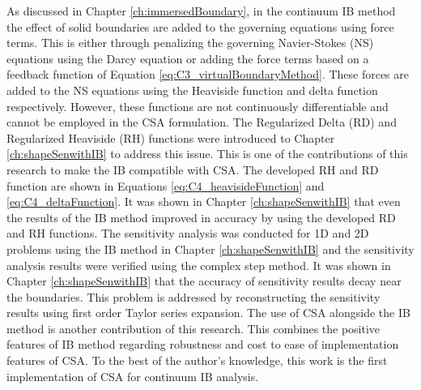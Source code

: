 As discussed in Chapter \ref{ch:immersedBoundary}, in the continuum IB method the effect of solid boundaries are added to the governing equations using force terms. This is either through penalizing the governing Navier-Stokes (NS) equations using the Darcy equation or adding the force terms based on a feedback function of Equation \eqref{eq:C3_virtualBoundaryMethod}. These forces are added to the NS equations using the Heaviside function and delta function respectively. However, these functions are not continuously differentiable and cannot be employed in the CSA formulation. The Regularized Delta (RD) and Regularized Heaviside (RH) functions were introduced to Chapter \ref{ch:shapeSenwithIB} to address this issue. This is one of the contributions of this research to make the IB compatible with CSA. The developed RH and RD function are shown in Equations \eqref{eq:C4_heavisideFunction} and \eqref{eq:C4_deltaFunction}. It was shown in Chapter \ref{ch:shapeSenwithIB} that even the results of the IB method improved in accuracy by using the developed RD and RH functions. The sensitivity analysis was conducted for 1D and 2D problems using the IB method in Chapter \ref{ch:shapeSenwithIB} and the sensitivity analysis results were verified using the complex step method. It was shown in Chapter \ref{ch:shapeSenwithIB} that the accuracy of sensitivity results decay near the boundaries. This problem is addressed by reconstructing the sensitivity results using first order Taylor series expansion. The use of CSA alongside the IB method is another contribution of this research. This combines the positive features of IB method regarding robustness and cost to ease of implementation features of CSA. To the best of the author's knowledge, this work is the first implementation of CSA for continuum IB analysis.


